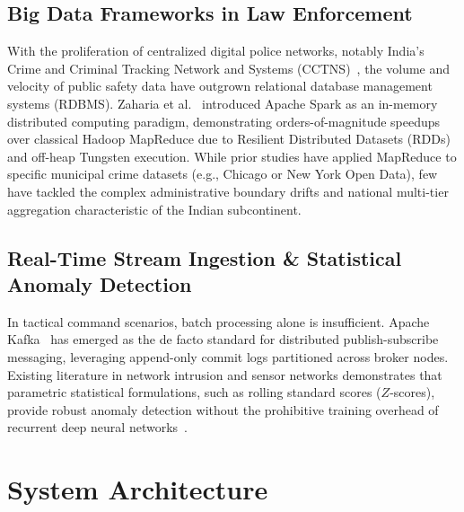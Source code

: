 \documentclass[conference]{IEEEtran}
\begin{document}
\subsection{Big Data Frameworks in Law Enforcement}
With the proliferation of centralized digital police networks, notably India's Crime and Criminal Tracking Network and Systems (CCTNS)~\cite{cctns2018}, the volume and velocity of public safety data have outgrown relational database management systems (RDBMS). Zaharia et al.~\cite{zaharia2016apache} introduced Apache Spark as an in-memory distributed computing paradigm, demonstrating orders-of-magnitude speedups over classical Hadoop MapReduce due to Resilient Distributed Datasets (RDDs) and off-heap Tungsten execution. While prior studies have applied MapReduce to specific municipal crime datasets (e.g., Chicago or New York Open Data), few have tackled the complex administrative boundary drifts and national multi-tier aggregation characteristic of the Indian subcontinent.

\subsection{Real-Time Stream Ingestion \& Statistical Anomaly Detection}
In tactical command scenarios, batch processing alone is insufficient. Apache Kafka~\cite{kreps2011kafka} has emerged as the de facto standard for distributed publish-subscribe messaging, leveraging append-only commit logs partitioned across broker nodes. Existing literature in network intrusion and sensor networks demonstrates that parametric statistical formulations, such as rolling standard scores ($Z$-scores), provide robust anomaly detection without the prohibitive training overhead of recurrent deep neural networks~\cite{chandola2009anomaly}.

\section{System Architecture}
\end{document}
